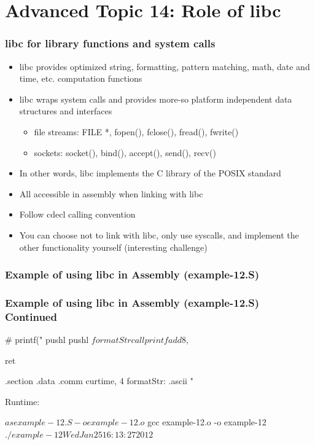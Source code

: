 \documentclass[11pt,xcolor=dvipsnames]{beamer}
\newcommand{\vs}{\vspace{0.5em}}
\newcommand{\mvs}{\vspace{-0.95em}}
\begin{document}
\section{Advanced Topic 14: Role of libc}

\begin{frame}[fragile,t]
\frametitle{{\ttfamily libc} for library functions and system calls}
\begin{itemize}
  \item {\ttfamily libc} provides optimized string, formatting, pattern matching, math, date and time, etc. computation functions
  \item {\ttfamily libc} wraps system calls and provides more-so platform independent data structures and interfaces
  \begin{itemize}
    \item file streams: {\ttfamily FILE *, fopen(), fclose(), fread(), fwrite()}
    \item sockets: {\ttfamily socket(), bind(), accept(), send(), recv()}
  \end{itemize}
  \item In other words, {\ttfamily libc} implements the C library of the POSIX standard
  \vs
  \vs
  \pause
  \item All accessible in assembly when linking with {\ttfamily libc}
  \item Follow {\ttfamily cdecl} calling convention
  \item You can choose not to link with libc, only use syscalls, and implement the other functionality yourself (interesting challenge)
\end{itemize}
\end{frame}

\begin{frame}[fragile,t]
\mvs
\frametitle{Example of using libc in Assembly (example-12.S)}
\end{frame}

\begin{frame}[fragile,t]
\mvs
\frametitle{Example of using libc in Assembly (example-12.S) Continued}
\begin{gascode}
  # printf("%
  pushl %
  pushl $formatStr
  call printf
  add $8, %

  ret

.section .data
  .comm curtime, 4
  formatStr:  .ascii "%
\end{gascode}
{\small Runtime:}
\begin{textcode}
$ as example-12.S -o example-12.o
$ gcc example-12.o -o example-12
$ ./example-12
Wed Jan 25 16:13:27 2012
$
\end{textcode}
\end{frame}
\end{document}
